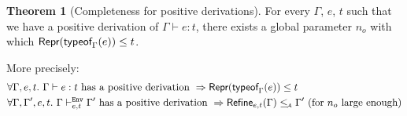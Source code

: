 \documentclass[a4paper]{article}
\theoremstyle{definition}
\newtheorem{theorem}{Theorem}
\begin{document}
  \begin{theorem}[Completeness for positive derivations]
    For every $\Gamma$, $e$, $t$ such that we have a positive derivation of $\Gamma \vdash e:t$,
    there exists a global parameter $n_o$ with which $\textsf{Repr}(\textsf{typeof}_{\Gamma}(e)) \leq t$.

    More precisely:
    \begin{align*}
      &\forall \Gamma, e, t.\ \Gamma \vdash e:t \text{ has a positive derivation } \Rightarrow \textsf{Repr}(\textsf{typeof}_{\Gamma}(e)) \leq t\\
      &\forall \Gamma, \Gamma', e, t.\ \Gamma \vdash^{\texttt{Env}}_{e,t} \Gamma' \text{ has a positive derivation } \Rightarrow \textsf{Refine}_{e,t}(\Gamma) \leq_{\!\scriptscriptstyle\mathcal{A}} \Gamma' \text{ (for $n_o$ large enough)}
    \end{align*}
  \end{theorem}
\end{document}
